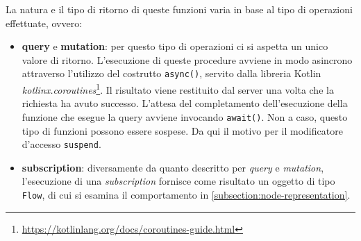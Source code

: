La natura e il tipo di ritorno di queste funzioni varia in base al tipo di operazioni effettuate, ovvero:
\begin{itemize}
	\item \textbf{query} e \textbf{mutation}: per questo tipo di operazioni ci si aspetta un unico valore di ritorno. L'esecuzione di queste procedure avviene in modo asincrono attraverso l'utilizzo del costrutto \texttt{async()}, servito dalla libreria Kotlin \textit{kotlinx.coroutines}\footnote{\url{https://kotlinlang.org/docs/coroutines-guide.html}}. Il risultato viene restituito dal server una volta che la richiesta ha avuto successo. L'attesa del completamento dell'esecuzione della funzione che esegue la query avviene invocando \texttt{await()}. Non a caso, questo tipo di funzioni possono essere sospese. Da qui il motivo per il modificatore d'accesso \texttt{suspend}.
	\item \textbf{subscription}: diversamente da quanto descritto per \textit{query} e \textit{mutation}, l'esecuzione di una \textit{subscription} fornisce come risultato un oggetto di tipo \texttt{Flow}, di cui si esamina il comportamento in \cref{subsection:node-representation}.
\end{itemize}

